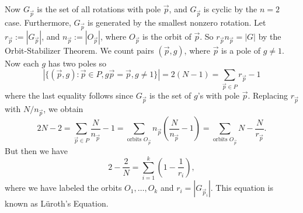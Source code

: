 Now $G_{\vec{p}}$ is the set of all rotations with pole $\vec{p}$, and $G_{\vec{p}}$ is cyclic by the $n=2$ case. Furthermore, $G_{\vec{p}}$ is generated by the smallest nonzero rotation. Let $r_{\vec{p}}:= |G_{\vec{p}}|$, and $n_{\vec{p}}:=|O_{\vec{p}}|$, where $O_{\vec{p}}$ is the orbit of $\vec{p}$. So $r_{\vec{p}} n_{\vec{p}}=|G|$ by the Orbit-Stabilizer Theorem. We count pairs $(\vec{p},g)$, where $\vec{p}$ is a pole of $g \neq 1$. Now each $g$ has two poles so
	\[
	|\{ (\vec{p},g) \colon \vec{p} \in P, g\vec{p}=\vec{p}, g \neq 1\}| = 2 (N-1) = \sum_{\vec{p} \in P} r_{\vec{p}} - 1
	\]
where the last equality follows since $G_{\vec{p}}$ is the set of $g$'s with pole $\vec{p}$. Replacing $r_{\vec{p}}$ with $N/n_{\vec{p}}$, we obtain 
	\[
	2N-2 = \sum_{\vec{p} \in P} \dfrac{N}{n_{\vec{p}}} -1 = \sum_{\text{orbits }O_{\vec{p}}} n_{\vec{p}} \left(\dfrac{N}{n_{\vec{p}}} -1 \right) = \sum_{\text{orbits }O_{\vec{p}}} N - \dfrac{N}{r_{\vec{p}}}.
	\]
But then we have
	\[
	2 - \dfrac{2}{N} = \sum_{i=1}^k \left( 1 - \dfrac{1}{r_i}\right),
	\]
where we have labeled the orbits $O_1,\ldots,O_k$ and $r_i= |G_{\vec{p}_i}|$. This equation is known as L\"uroth's Equation. 

